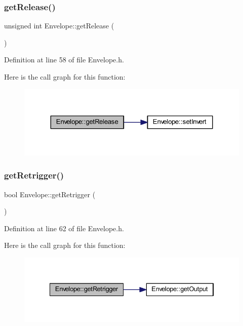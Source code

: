\subsubsection{\texorpdfstring{get\+Release()}{getRelease()}}
{\footnotesize\ttfamily unsigned int Envelope\+::get\+Release (\begin{DoxyParamCaption}{ }\end{DoxyParamCaption})\hspace{0.3cm}{\ttfamily [inline]}}



Definition at line 58 of file Envelope.\+h.

Here is the call graph for this function\+:
\nopagebreak
\begin{figure}[H]
\begin{center}
\leavevmode
\includegraphics[width=324pt]{d7/df3/class_envelope_a96815367d569e8bdd8d5798475a0ab76_cgraph}
\end{center}
\end{figure}
\mbox{\label{class_envelope_a4d944da1edd2a5ca2dfa95482f933037}} 
\subsubsection{\texorpdfstring{get\+Retrigger()}{getRetrigger()}}
{\footnotesize\ttfamily bool Envelope\+::get\+Retrigger (\begin{DoxyParamCaption}{ }\end{DoxyParamCaption})\hspace{0.3cm}{\ttfamily [inline]}}



Definition at line 62 of file Envelope.\+h.

Here is the call graph for this function\+:
\nopagebreak
\begin{figure}[H]
\begin{center}
\leavevmode
\includegraphics[width=334pt]{d7/df3/class_envelope_a4d944da1edd2a5ca2dfa95482f933037_cgraph}
\end{center}
\end{figure}
\mbox{\label{class_envelope_a1d3627f6be1cce69aae37575b9bcdc69}} 
